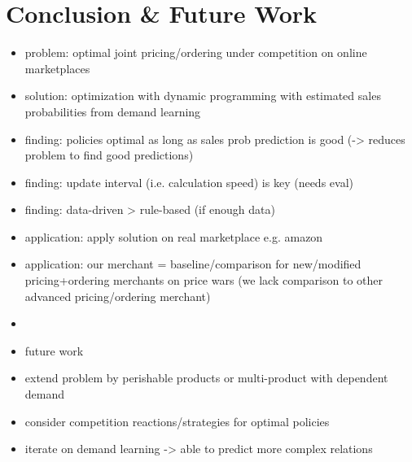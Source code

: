 
\chapter{Conclusion \& Future Work}

\begin{itemize}
	\item problem: optimal joint pricing/ordering under competition on online marketplaces
	\item solution: optimization with dynamic programming with estimated sales probabilities from demand learning
	\item finding: policies optimal as long as sales prob prediction is good (-> reduces problem to find good predictions)
	\item finding: update interval (i.e. calculation speed) is key (needs eval)
	\item finding: data-driven > rule-based (if enough data)
	\item application: apply solution on real marketplace e.g. amazon
	\item application: our merchant = baseline/comparison for new/modified pricing+ordering merchants on price wars (we lack comparison to other advanced pricing/ordering merchant)
	\item
	\item future work
	\item extend problem by perishable products or multi-product with dependent demand
	\item consider competition reactions/strategies for optimal policies %
	\item iterate on demand learning -> able to predict more complex relations
\end{itemize}



